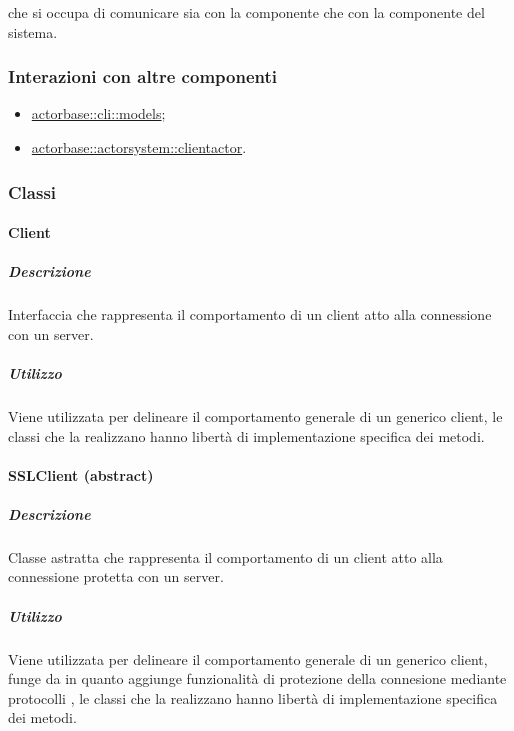 \documentclass{scalatekids-article}
\begin{document}
 che si occupa di comunicare sia con la componente 
che con la componente  del sistema.

\subsubsection{Interazioni con altre componenti}

\begin{itemize}
\item \hyperref[sec:actorbase::cli::models]{actorbase::cli::models};
\item \hyperref[sec:actorbase::actorsystem::clientactor]{actorbase::actorsystem::clientactor}.
\end{itemize}

\subsubsection{Classi}

\paragraph{Client}
\label{sec:actorbase::driver::client::Client}

\subparagraph{Descrizione}

Interfaccia che rappresenta il comportamento di un client atto alla connessione
con un server.

\subparagraph{Utilizzo}

Viene utilizzata per delineare il comportamento generale di un generico client,
le classi che la realizzano hanno libertà di implementazione specifica dei
metodi.

\paragraph{SSLClient (abstract)}
\label{sec:actorbase::driver::client::SSLClient}

\subparagraph{Descrizione}

Classe astratta che rappresenta il comportamento di un client atto alla connessione
protetta con un server.

\subparagraph{Utilizzo}

Viene utilizzata per delineare il comportamento generale di un generico client,
funge da  in quanto aggiunge funzionalità di protezione della
connesione mediante protocolli , le classi che la realizzano
hanno libertà di implementazione specifica dei metodi.
\end{document}
